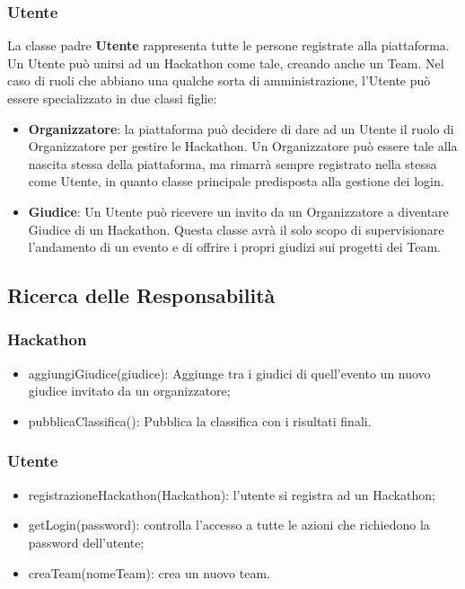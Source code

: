 \documentclass[a4paper, 15pt, oneside]{article}
\begin{document}
	\subsubsection{Utente}
	La classe padre \textbf{Utente} rappresenta tutte le persone registrate alla piattaforma. Un Utente può unirsi ad un Hackathon come tale, creando anche un Team.
	Nel caso di ruoli che abbiano una qualche sorta di amministrazione, l'Utente può essere specializzato in due classi figlie:
	\begin{itemize}
		\item \textbf{Organizzatore}: la piattaforma può decidere di dare ad un Utente il ruolo di Organizzatore per gestire le Hackathon. Un Organizzatore può essere tale alla nascita stessa della piattaforma, ma rimarrà sempre registrato nella stessa come Utente, in quanto classe principale predisposta alla gestione dei login.
		\item \textbf{Giudice}: Un Utente può ricevere un invito da un Organizzatore a diventare Giudice di un Hackathon. Questa classe avrà il solo scopo di supervisionare l'andamento di un evento e di offrire i propri giudizi sui progetti dei Team.
	\end{itemize}
	\subsection{Ricerca delle Responsabilità}
	\subsubsection{Hackathon}
	\begin{itemize}
		\item aggiungiGiudice(giudice): Aggiunge tra i giudici di quell'evento un nuovo giudice invitato da un organizzatore;
		\item pubblicaClassifica(): Pubblica la classifica con i risultati finali.
	\end{itemize}
	\subsubsection{Utente}
	\begin{itemize}
		\item registrazioneHackathon(Hackathon): l'utente si registra ad un Hackathon;
		\item getLogin(password): controlla l'accesso a tutte le azioni che richiedono la password dell'utente;
		\item creaTeam(nomeTeam): crea un nuovo team.
	\end{itemize}
\end{document}
